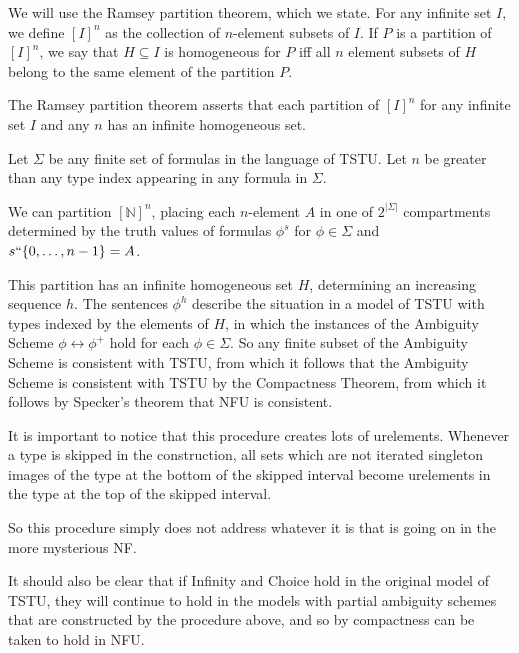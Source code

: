 \documentclass{slides}
\begin{document}
\begin{slide}




We will use the Ramsey partition theorem, which we state.  For any infinite set $I$, we define $[I]^n$ as the collection of $n$-element subsets of $I$.  If $P$ is a partition
of $[I]^n$, we say that $H \subseteq I$ is homogeneous for $P$ iff all $n$ element subsets of $H$ belong to the same element of the partition $P$.

The Ramsey partition theorem asserts that each partition of $[I]^n$ for any infinite set $I$ and any $n$ has an infinite homogeneous set.

\end{slide}

\begin{slide}

Let $\Sigma$ be any finite set of formulas in the language of TSTU.  Let $n$ be greater than any type index appearing in any formula in $\Sigma$.

We can partition $[{\mathbb N}]^n$, placing each $n$-element $A$ in one of $2^{|\Sigma|}$ compartments determined by the truth values of formulas $\phi^s$ for
$\phi \in \Sigma$ and $s``\{0,\ldots,n-1\} = A$.

This partition has an infinite homogeneous set $H$, determining an increasing sequence $h$.  The sentences $\phi^h$ describe the situation in a model of TSTU with
types indexed by the elements of $H$, in which the instances of the Ambiguity Scheme $\phi \leftrightarrow \phi^+$ hold for each $\phi \in \Sigma$.  So any finite subset
of the Ambiguity Scheme is consistent with TSTU, from which it follows that the Ambiguity Scheme is consistent with TSTU by the Compactness Theorem, from which it follows by Specker's theorem that NFU is consistent.

\end{slide}

\begin{slide}

It is important to notice that this procedure creates lots of urelements.  Whenever a type is skipped in the construction, all sets which are not iterated singleton images of the type at the bottom of the skipped interval become urelements in the type at the top of the skipped interval.

So this procedure simply does not address whatever it is that is going on in the more mysterious NF.

It should also be clear that if Infinity and Choice hold in the original model of TSTU, they will continue to hold in the models with partial ambiguity schemes that are constructed by the procedure above, and so by compactness can be taken to hold in NFU.


\end{slide}
\end{document}
